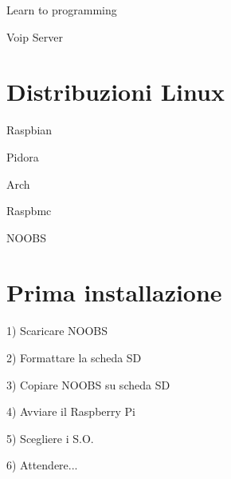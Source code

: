 \documentclass[xcolor=svgnames,11pt]{beamer}
\begin{document}
\begin{frame}{Learn to programming}
\end{frame}

\begin{frame}{Voip Server}
\end{frame}

\section{Distribuzioni Linux}

\begin{frame}{Raspbian}
\end{frame}

\begin{frame}{Pidora}
\end{frame}

\begin{frame}{Arch}
\end{frame}

\begin{frame}{Raspbmc}
\end{frame}

\begin{frame}{NOOBS}
\end{frame}

\section{Prima installazione}

\begin{frame}{1) Scaricare NOOBS}
\end{frame}

\begin{frame}{2) Formattare la scheda SD}
\end{frame}

\begin{frame}{3) Copiare NOOBS su scheda SD} 
\end{frame}

\begin{frame}{4) Avviare il Raspberry Pi}
\end{frame}

\begin{frame}{5) Scegliere i S.O.}
\end{frame}

\begin{frame}{6) Attendere...}
\end{frame}
\end{document}
